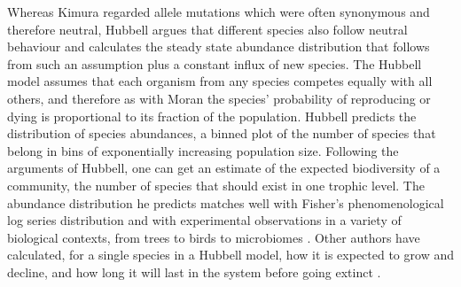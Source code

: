 Whereas Kimura regarded allele mutations which were often synonymous and therefore neutral, Hubbell argues that different species also follow neutral behaviour and calculates the steady state abundance distribution that follows from such an assumption plus a constant influx of new species. %
The Hubbell model assumes that each organism from any species competes equally with all others, and therefore as with Moran the species' probability of reproducing or dying is proportional to its fraction of the population.
Hubbell predicts the distribution of species abundances, a binned plot of the number of species that belong in bins of exponentially increasing population size. 
Following the arguments of Hubbell, one can get an estimate of the expected biodiversity of a community, the number of species that should exist in one trophic level. 
The abundance distribution he predicts matches well with Fisher's phenomenological log series distribution \cite{Fisher1943,McKane2003} and with experimental observations in a variety of biological contexts, from trees to birds to microbiomes \cite{Hubbell2001}. 
Other authors have calculated, for a single species in a Hubbell model, how it is expected to grow and decline, and how long it will last in the system before going extinct \cite{Azaele2006,Leigh2007,Pigolotti2013,Kalyuzhny2014}. 

